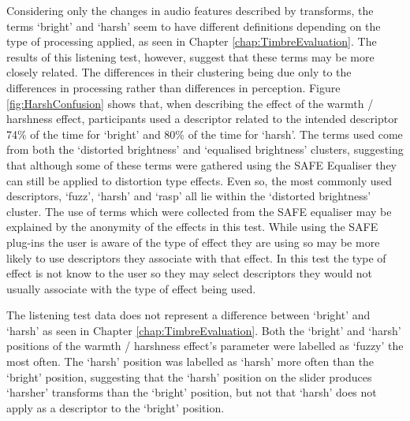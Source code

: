 			Considering only the changes in audio features described by transforms, the terms `bright' and
			`harsh' seem to have different definitions depending on the type of processing applied, as seen in
			Chapter \ref{chap:TimbreEvaluation}. The results of this listening test, however, suggest that
			these terms may be more closely related. The differences in their clustering being due only to the
			differences in processing rather than differences in perception. Figure \ref{fig:HarshConfusion}
			shows that, when describing the effect of the warmth / harshness effect, participants used a
			descriptor related to the intended descriptor 74\% of the time for `bright' and 80\% of the time
			for `harsh'. The terms used come from both the `distorted brightness' and `equalised brightness'
			clusters, suggesting that although some of these terms were gathered using the SAFE Equaliser they
			can still be applied to distortion type effects. Even so, the most commonly used descriptors,
			`fuzz', `harsh' and `rasp' all lie within the `distorted brightness' cluster. The use of terms
			which were collected from the SAFE equaliser may be explained by the anonymity of the effects in
			this test. While using the SAFE plug-ins the user is aware of the type of effect they are using so
			may be more likely to use descriptors they associate with that effect. In this test the type of
			effect is not know to the user so they may select descriptors they would not usually associate with
			the type of effect being used.

			The listening test data does not represent a difference between `bright' and `harsh' as seen in
			Chapter \ref{chap:TimbreEvaluation}. Both the `bright' and `harsh' positions of the warmth /
			harshness effect's parameter were labelled as `fuzzy' the most often. The `harsh' position was
			labelled as `harsh' more often than the `bright' position, suggesting that the `harsh' position on
			the slider produces `harsher' transforms than the `bright' position, but not that `harsh' does not
			apply as a descriptor to the `bright' position.
			
